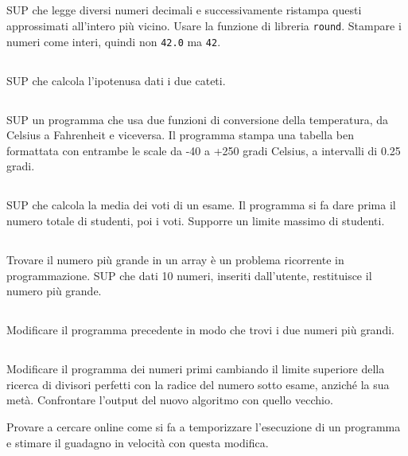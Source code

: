 \documentclass{article}
\begin{document}
\subsection{}
SUP che legge diversi numeri decimali e successivamente ristampa questi approssimati all'intero più vicino. Usare la funzione di libreria \texttt{round}. Stampare i numeri come interi, quindi non \texttt{42.0} ma \texttt{42}.

\subsection{}
SUP che calcola l'ipotenusa dati i due cateti. 

\subsection{}
SUP un programma che usa due funzioni di conversione della temperatura, da Celsius a Fahrenheit e viceversa. Il programma stampa una tabella ben formattata con entrambe le scale da -40 a +250 gradi Celsius, a intervalli di 0.25 gradi.

\subsection{}
SUP che calcola la media dei voti di un esame. Il programma si fa dare prima il numero totale di studenti, poi i voti. Supporre un limite massimo di studenti. 


\subsection{}
Trovare il numero più grande in un array è un problema ricorrente in programmazione. SUP che dati 10 numeri, inseriti dall'utente, restituisce il numero più grande.

\subsection{}
Modificare il programma precedente in modo che trovi i due numeri più grandi.

\subsection{}
Modificare il programma dei numeri primi cambiando il limite superiore della ricerca di divisori perfetti con la radice del numero sotto esame, anziché la sua metà. Confrontare l'output del nuovo algoritmo con quello vecchio. 
\begin{info} 
	Provare a cercare online come si fa a temporizzare l'esecuzione di un programma e stimare il guadagno in velocità con questa modifica.
\end{info}
\end{document}
